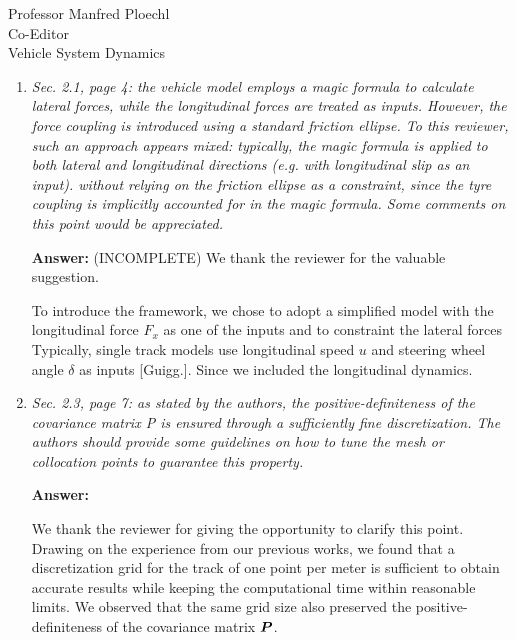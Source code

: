 \documentclass{letter}
\begin{document}
\begin{letter}{Professor Manfred Ploechl\\
Co-Editor\\
Vehicle System Dynamics}
\begin{enumerate}
In further works we are actually planning to adopt more complex models and to parallelize the problem solution on multiple cores. This approach has been explored by our research group in previous works [...], where the nominal minumim lap-time problem was solved for a 14-DoF's multibody model. 

Finally, since the reviewer has pointed out this specific feature, we would like to remark that, although the out-of-plane dynamics is neglected in our model, we took into account longitudinal load transfers. 

\hrulefill

\item
\textit{Sec. 2.1, page 4: the vehicle model employs a magic formula to calculate lateral forces, while the longitudinal forces are treated as inputs. However, the force coupling is introduced using a standard friction ellipse. To this reviewer, such an approach appears mixed: typically, the magic formula is applied to both lateral and longitudinal directions (e.g. with longitudinal slip as an input). without relying on the friction ellipse as a constraint, since the tyre coupling is implicitly accounted for in the magic formula. Some comments on this point would be appreciated.}

\vspace{2mm}

\textbf{Answer:}
(INCOMPLETE)
We thank the reviewer for the valuable suggestion. 

To introduce the framework, we chose to adopt a simplified model with the longitudinal force $F_x$ as one of the inputs and to constraint the lateral forces 
Typically, single track models use longitudinal speed $u$ and steering wheel angle $\delta$ as inputs [Guigg.]. Since we included the longitudinal dynamics.

\hrulefill

\item
\textit{Sec. 2.3, page 7: as stated by the authors, the positive-definiteness of the covariance matrix P is ensured through a sufficiently fine discretization. The authors should provide some guidelines on how to tune the mesh or collocation points to guarantee this property.
}

\vspace{2mm}

\textbf{Answer:}

We thank the reviewer for giving the opportunity to clarify this point. Drawing on the experience from our previous works, we found that a discretization grid for the track of one point per meter is sufficient to obtain accurate results while keeping the computational time within reasonable limits. We observed that the same grid size also preserved the positive-definiteness of the covariance matrix $\boldsymbol{P}$.


\end{enumerate}
\end{letter}
\end{document}
